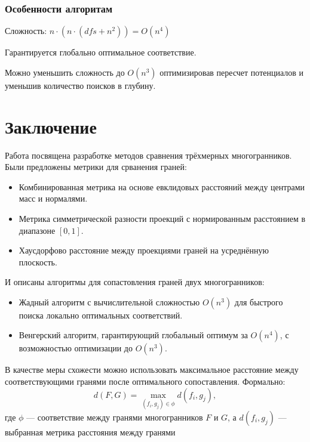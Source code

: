 \documentclass[a4paper,14pt]{extarticle}
\theoremstyle{remark} %
\begin{document}
\subsubsection{Особенности алгоритам}
Сложность: $n \cdot (n \cdot (dfs + n^2)) = O(n^4)$\par
Гарантируется глобально оптимальное соответствие.\par
Можно уменьшить сложность до $O(n^3)$ оптимизировав пересчет потенциалов и уменьшив количество поисков в глубину.

\section{Заключение}

Работа посвящена разработке методов сравнения трёхмерных многогранников. Были предложены метрики для срванения граней:
\begin{itemize}
    \item Комбинированная метрика на основе евклидовых расстояний между центрами масс и нормалями.
    \item Метрика симметрической разности проекций с нормированным расстоянием в диапазоне $[0, 1]$.
    \item Хаусдорфово расстояние между проекциями граней на усреднённую плоскость.
\end{itemize}
И описаны  алгоритмы для сопастовления граней двух многогранников:
\begin{itemize}
    \item Жадный алгоритм с вычислительной сложностью $O(n^3)$ для быстрого поиска локально оптимальных соответствий.
    \item Венгерский алгоритм, гарантирующий глобальный оптимум за $O(n^4)$, с возможностью оптимизации до $O(n^3)$.
\end{itemize}

В качестве меры схожести можно использовать максимальное расстояние между соответствующими гранями после оптимального сопоставления.
Формально:
\begin{equation}
    d(F, G) = \max_{(f_i, g_j) \in \phi} d(f_i, g_j),
\end{equation}
где $\phi$ — соответствие между гранями многогранников $F$ и $G$, а $d(f_i, g_j)$ — выбранная метрика расстояния между гранями
\end{document}
